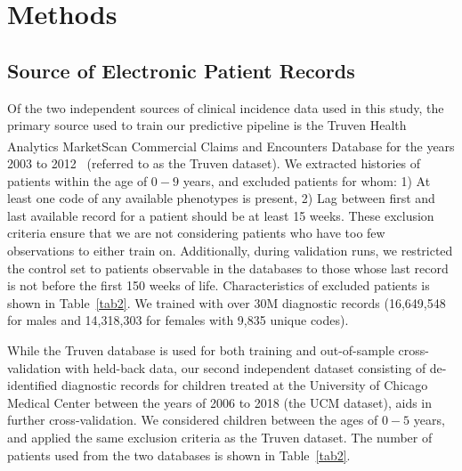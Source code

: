 \documentclass[3p,super,numbers,sort&compress,preprint,10pt]{elsarticle}
\begin{document}

\section*{Methods}


\subsection*{Source of Electronic Patient Records}
Of the two independent sources of clinical incidence data used in this study,  the primary source used to train our predictive pipeline  is the Truven Health Analytics  MarketScan\textsuperscript{\textregistered} Commercial Claims and Encounters Database for the years 2003 to 2012~\cite{hansen2017truven} (referred to  as the Truven dataset). 
We extracted histories of patients within the age of $0-9$ years, and excluded  patients for whom:  1) At least one code of any available phenotypes is present, 2) Lag between first and last available record for a patient should be at least 15 weeks. These exclusion criteria ensure that we are not considering patients who have too few observations to either train on. Additionally, during validation runs,  we restricted the control set to patients observable in the databases to those whose last record is not before the first 150 weeks of life. Characteristics of excluded patients is shown in Table~\ref{tab2}.
We trained with over  30M diagnostic records (16,649,548 for males and  14,318,303  for females with 9,835 unique  codes).

%

While the Truven database is used for both training and out-of-sample cross-validation with held-back  data, our second independent dataset  consisting of de-identified diagnostic records for children treated at the University of Chicago Medical Center between the years of 2006 to 2018 (the UCM dataset), aids in further cross-validation. We considered children between the ages of $0-5$ years, and  applied the same exclusion criteria as the Truven dataset.  The  number of  patients used from the two databases is shown in Table~\ref{tab2}.
\end{document}

